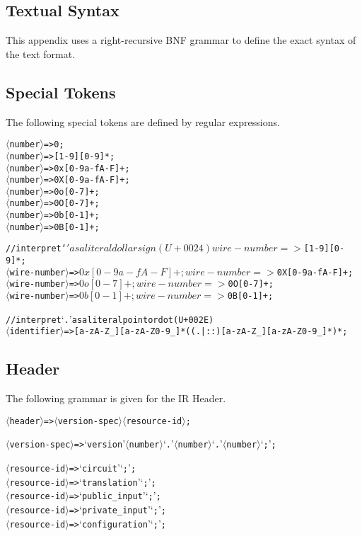 
\begin{appendices}

\section{Textual Syntax}\label{text_syntax}
This appendix uses a right-recursive BNF grammar to define the exact syntax of the text format.\\

\newcommand{\nterm}[1]{$\langle$#1$\rangle$}
\newcommand{\term}[1]{`#1'}

\subsection{Special Tokens} \label{appendix_special_tokens}
The following special tokens are defined by regular expressions.

\begin{alltt}
  \nterm{number} => 0 ;
  \nterm{number} => [1-9][0-9]* ;
  \nterm{number} => 0x[0-9a-fA-F]+ ;
  \nterm{number} => 0X[0-9a-fA-F]+ ;
  \nterm{number} => 0o[0-7]+ ;
  \nterm{number} => 0O[0-7]+ ;
  \nterm{number} => 0b[0-1]+ ;
  \nterm{number} => 0B[0-1]+ ;

  // interpret `$' as a literal dollar sign (U+0024)
  \nterm{wire-number} => $[1-9][0-9]* ;
  \nterm{wire-number} => $0x[0-9a-fA-F]+ ;
  \nterm{wire-number} => $0X[0-9a-fA-F]+ ;
  \nterm{wire-number} => $0o[0-7]+ ;
  \nterm{wire-number} => $0O[0-7]+ ;
  \nterm{wire-number} => $0b[0-1]+ ;
  \nterm{wire-number} => $0B[0-1]+ ;

  // interpret `.' as a literal point or dot (U+002E)
  \nterm{identifier} => [a-zA-Z_][a-zA-Z0-9_]*((.|::)[a-zA-Z_][a-zA-Z0-9_]*)* ;
\end{alltt}

\subsection{Header}
The following grammar is given for the IR Header.

\begin{alltt}
\nterm{header} => \nterm{version-spec} \nterm{resource-id} ;

\nterm{version-spec} => \term{version} \nterm{number} \term{.} \nterm{number} \term{.} \nterm{number} \term{;} ;

\nterm{resource-id} => \term{circuit} \term{;} ;
\nterm{resource-id} => \term{translation} \term{;} ;
\nterm{resource-id} => \term{public_input} \term{;} ;
\nterm{resource-id} => \term{private_input} \term{;} ;
\nterm{resource-id} => \term{configuration} \term{;} ;
\end{alltt}


\end{appendices}
